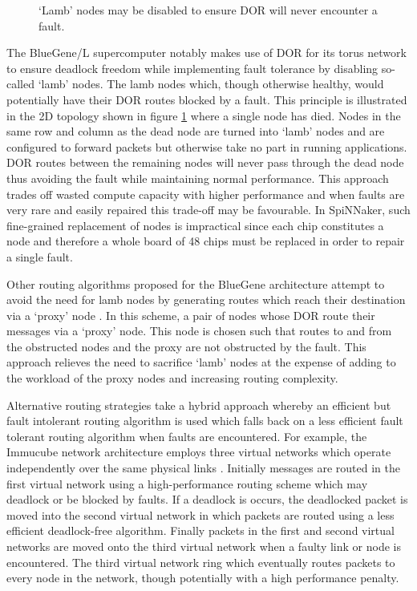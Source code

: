 			\begin{figure}
				\center
				
				\caption{`Lamb' nodes may be disabled to ensure DOR will never
				encounter a fault.}
				\label{fig:lamb-nodes}
			\end{figure}
			
			The BlueGene/L supercomputer \cite{adiga02} notably makes use of DOR for
			its torus network to ensure deadlock freedom while implementing fault
			tolerance by disabling so-called `lamb' nodes. The lamb nodes which,
			though otherwise healthy, would potentially have their DOR routes blocked
			by a fault. This principle is illustrated in the 2D topology shown in
			figure \ref{fig:lamb-nodes} where a single node has died. Nodes in the
			same row and column as the dead node are turned into `lamb' nodes and are
			configured to forward packets but otherwise take no part in running
			applications. DOR routes between the remaining nodes will never pass
			through the dead node thus avoiding the fault while maintaining normal
			performance. This approach trades off wasted compute capacity with higher
			performance and when faults are very rare and easily repaired this
			trade-off may be favourable. In SpiNNaker, such fine-grained replacement
			of nodes is impractical since each chip constitutes a node and therefore
			a whole board of 48 chips must be replaced in order to repair a single
			fault.
			
			Other routing algorithms proposed for the BlueGene architecture attempt
			to avoid the need for lamb nodes by generating routes which reach their
			destination via a `proxy' node \cite{gomez04}. In this scheme, a pair of
			nodes whose DOR route their messages via a `proxy' node.  This node is
			chosen such that routes to and from the obstructed nodes and the proxy
			are not obstructed by the fault. This approach relieves the need to
			sacrifice `lamb' nodes at the expense of adding to the workload of the
			proxy nodes and increasing routing complexity.
			
			Alternative routing strategies take a hybrid approach whereby an
			efficient but fault intolerant routing algorithm is used which falls back
			on a less efficient fault tolerant routing algorithm when faults are
			encountered. For example, the Immucube network architecture employs three
			virtual networks which operate independently over the same physical links
			\cite{puente07}. Initially messages are routed in the first virtual
			network using a high-performance routing scheme which may deadlock or be
			blocked by faults.  If a deadlock is occurs, the deadlocked packet is
			moved into the second virtual network in which packets are routed using a
			less efficient deadlock-free algorithm. Finally packets in the first and
			second virtual networks are moved onto the third virtual network when a
			faulty link or node is encountered. The third virtual network ring which
			eventually routes packets to every node in the network, though
			potentially with a high performance penalty.
			
